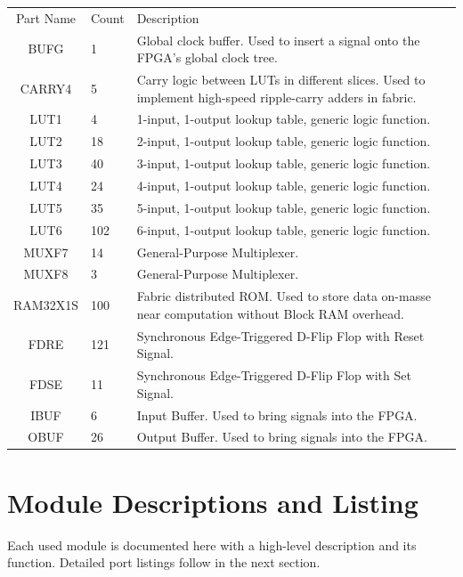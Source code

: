 \documentclass[12pt]{article}
\begin{document}
\newpage
\begin{center}
\begin{tabularx}{\linewidth}{ ||c|l|X|| }
    \hline
    Part Name & Count & Description\\
    BUFG     &     1  & Global clock buffer. Used to insert a signal onto the FPGA's
    global clock tree. \\
    CARRY4   &     5  & Carry logic between LUTs in different slices. Used to
    implement high-speed ripple-carry adders in fabric.\\
    LUT1     &     4  & 1-input, 1-output lookup table, generic logic function. \\
    LUT2     &    18  & 2-input, 1-output lookup table, generic logic function. \\
    LUT3     &    40  & 3-input, 1-output lookup table, generic logic function. \\
    LUT4     &    24  & 4-input, 1-output lookup table, generic logic function. \\
    LUT5     &    35  & 5-input, 1-output lookup table, generic logic function. \\
    LUT6     &   102  & 6-input, 1-output lookup table, generic logic function. \\
    MUXF7    &    14  & General-Purpose Multiplexer. \\
    MUXF8    &     3  & General-Purpose Multiplexer. \\
    RAM32X1S &   100  & Fabric distributed ROM. Used to store data on-masse near
    computation without Block RAM overhead. \\
    FDRE     &   121  & Synchronous Edge-Triggered D-Flip Flop with Reset
    Signal. \\
    FDSE     &    11  & Synchronous Edge-Triggered D-Flip Flop with Set Signal. \\
    IBUF     &     6  & Input Buffer. Used to bring signals into the FPGA. \\
    OBUF     &    26  & Output Buffer. Used to bring signals into the FPGA. \\
    \hline
\end{tabularx}
\end{center}

\section{Module Descriptions and Listing}
Each used module is documented here with a high-level description and its
function. Detailed port listings follow in the next section.
\end{document}
